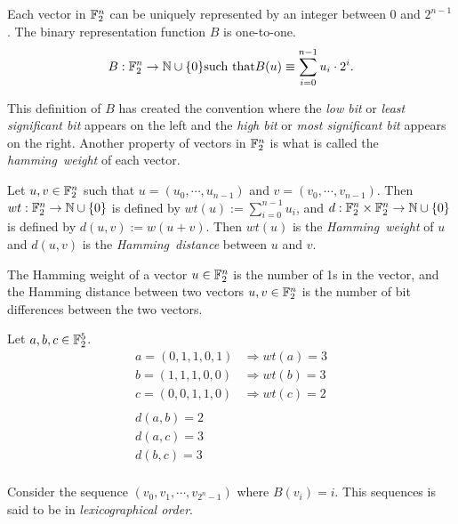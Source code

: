 \par Each vector in $\mathbb{F}_2^n$ can be uniquely represented by an integer between
$0$ and $2^{n-1}$. The binary representation function $B$ is one-to-one.
\begin{equation}
	B:\gftwo^n\rightarrow\nnn\cup\{0\} {\rm such\ that } B(u)\equiv \sum_{i=0}^{n-1}u_i\cdot2^i.
\end{equation}

\par This definition of $B$ has created the convention where the {\em low bit} or
{\em least significant bit} appears on the left and the {\em high bit} or {\em most significant bit}
appears on the right. Another property of vectors in $\mathbb{F}_2^n$ is what is called the {\em hamming\ weight}
of each vector.

\begin{definition}
\label{def:hamming}
	Let $u,v\in\mathbb{F}_2^n$ such that $u=(u_0,\cdots,u_{n-1})$ and $v=(v_0,\cdots,v_{n-1})$.
	Then $wt:\mathbb{F}_2^n\rightarrow\mathbb{N}\cup\{0\}$ is defined by $wt(u):=\sum_{i=0}^{n-1}u_i$,
	and $d:\mathbb{F}_2^n\times\mathbb{F}_2^n\rightarrow\mathbb{N}\cup\{0\}$ is defined by $d(u,v):=w(u+v)$.
	Then $wt(u)$ is the {\em Hamming\ weight} of $u$ and $d(u,v)$ is the {\em Hamming\ distance}
	between $u$ and $v$.
\end{definition}

\begin{remark}
	The Hamming weight of a vector $u\in\mathbb{F}_2^n$ is the number of 1s in the vector, and the
	Hamming distance between two vectors $u,v\in\mathbb{F}_2^n$ is the number of bit differences
	between the two vectors.
\end{remark}

\begin{example}
	Let $a,b,c\in\mathbb{F}_2^5$.
	\begin{align*}
		a=(0,1,1,0,1) &\Rightarrow wt(a)=3 \\
		b=(1,1,1,0,0) &\Rightarrow wt(b)=3 \\
		c=(0,0,1,1,0) &\Rightarrow wt(c)=2 \\
		\\
		d(a,b)=2\\
		d(a,c)=3\\
		d(b,c)=3\\
	\end{align*}
\end{example}
	
\par Consider the sequence $(v_0,v_1,\cdots,v_{2^n-1})$ where $B(v_i)=i$. This sequences
is said to be in {\em lexicographical order}.

